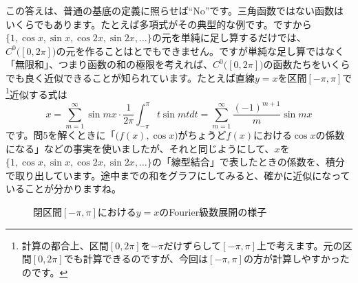 この答えは、普通の基底の定義に照らせば``No''です。三角函数ではない函数はいくらでもあります。たとえば多項式がその典型的な例です。ですから$\{1, \cos x, \sin x, \cos 2x, \sin 2x, \ldots\}$の元を単純に足し算するだけでは、$C^0\bigl([0, 2\pi]\bigr)$の元を作ることはとでもできません。ですが単純な足し算ではなく「無限和」、つまり函数の和の極限を考えれば、$C^0\bigl([0, 2\pi]\big)$の函数たちをいくらでも良く近似できることが知られています。たとえば直線$y = x$を区間$[-\pi, \pi]$で\footnote{計算の都合上、区間$[0, 2\pi]$を$-\pi$だけずらして$[-\pi, \pi]$上で考えます。元の区間$[0, 2\pi]$でも計算できるのですが、今回は$[-\pi, \pi]$の方が計算しやすかったのです。}近似する式は
\[
x = \sum_{m = 1}^{\infty} \sin mx \cdot \frac{1}{2\pi} \int_{-\pi}^{\pi} t \sin mt dt = \sum_{m = 1}^{\infty} \frac{(-1)^{m + 1}}{m} \sin mx
\]
です。問5を解くときに「$\bigl(f(x), \cos x\bigr)$がちょうど$f(x)$における$\cos x$の係数になる」などの事実を使いましたが、それと同じようにして、$x$を$\{1, \cos x, \sin x, \cos 2x, \sin 2x, \ldots\}$の「線型結合」で表したときの係数を、積分で取り出しています。途中までの和をグラフにしてみると、確かに近似になっていることが分かりますね。

\begin{figure}[h!tbp]
\centering
{} \raisebox{2.5zw}{$\longrightarrow$}
 \raisebox{2.5zw}{$\longrightarrow$}
 \raisebox{2.5zw}{$\longrightarrow$}
\caption{閉区間$[-\pi, \pi]$における$y = x$のFourier級数展開の様子}
\end{figure}


